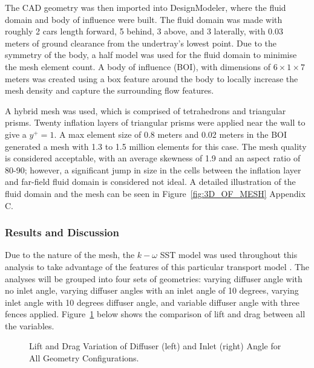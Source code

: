 \noindent The CAD geometry was then imported into DesignModeler, where the fluid domain and body of influence were built. The fluid domain was made with roughly 2 cars length forward, 5 behind, 3 above, and 3 laterally, with 0.03 meters of ground clearance from the undertray's lowest point. Due to the symmetry of the body, a half model was used for the fluid domain to minimise the mesh element count. A body of influence (BOI), with dimensions of  $6 \times 1 \times 7$ meters was created using a box feature around the body to locally increase the mesh density and capture the surrounding flow features.

\noindent A hybrid mesh was used, which is comprised of tetrahedrons and triangular prisms. Twenty inflation layers of triangular prisms were applied near the wall to give a $y^+=1$. A max element size of 0.8 meters and 0.02 meters in the BOI generated a mesh with 1.3 to 1.5 million elements for this case. The mesh quality is considered acceptable, with an average skewness of 1.9 and an aspect ratio of 80-90; however, a significant jump in size in the cells between the inflation layer and far-field fluid domain is considered not ideal. A detailed illustration of the fluid domain and the mesh can be seen in Figure~\ref{fig:3D_OF_MESH} Appendix C.

\subsubsection{Results and Discussion}
Due to the nature of the mesh, the $k-\omega$ SST model was used throughout this analysis to take advantage of the features of this particular transport model \cite{Ansys2006ModelingFlows}. The analyses will be grouped into four sets of geometries: varying diffuser angle with no inlet angle, varying diffuser angles with an inlet angle of 10 degrees, varying inlet angle with 10 degrees diffuser angle, and variable diffuser angle with three fences applied. Figure~\ref{fig:3D_OF_PLOT_COMPARE_ALL} below shows the comparison of lift and drag between all the variables.

\begin{figure}[htb!]
    \centering
    \noindent{}
    \caption{Lift and Drag Variation of Diffuser (left) and Inlet (right) Angle for All Geometry Configurations.}
    \label{fig:3D_OF_PLOT_COMPARE_ALL}
\end{figure}

